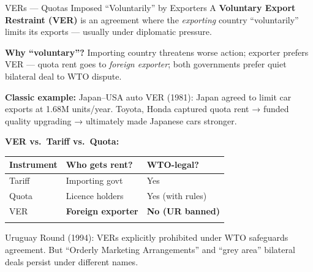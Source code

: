 \documentclass[
  ignorenonframetext,
  aspectratio=169,
]{beamer}
\makeatletter
\let\quarto@originallabel\label
\DeclareRobustCommand*{\label}[1]{\quarto@originallabel{#1}}
\makeatother
\begin{document}
\begin{frame}{VERs --- Quotas Imposed ``Voluntarily'' by Exporters}
\label{vers-quotas-imposed-voluntarily-by-exporters}
A \textbf{Voluntary Export Restraint (VER)} is an agreement where the
\emph{exporting} country ``voluntarily'' limits its exports --- usually
under diplomatic pressure.

\textbf{Why ``voluntary''?} Importing country threatens worse action;
exporter prefers VER --- quota rent goes to \emph{foreign exporter};
both governments prefer quiet bilateral deal to WTO dispute.

\textbf{Classic example:} Japan--USA auto VER (1981): Japan agreed to
limit car exports at 1.68M units/year. Toyota, Honda captured quota rent
→ funded quality upgrading → ultimately made Japanese cars stronger.

\textbf{VER vs.~Tariff vs.~Quota:}

\begin{longtable}[]{@{}lll@{}}
\toprule\noalign{}
Instrument & Who gets rent? & WTO-legal? \\
\midrule\noalign{}
\endhead
Tariff & Importing govt & Yes \\
Quota & Licence holders & Yes (with rules) \\
VER & \textbf{Foreign exporter} & \textbf{No (UR banned)} \\
\bottomrule\noalign{}
\end{longtable}

Uruguay Round (1994): VERs explicitly prohibited under WTO safeguards
agreement. But ``Orderly Marketing Arrangements'' and ``grey area''
bilateral deals persist under different names.
\end{frame}
\end{document}
